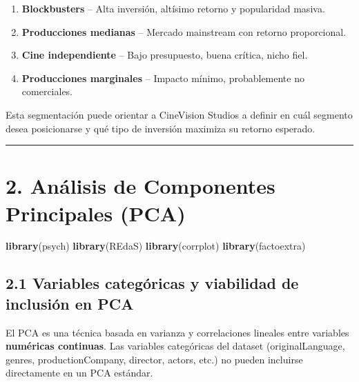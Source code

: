 \documentclass[
]{article}
\newenvironment{Shaded}{\begin{snugshade}}{\end{snugshade}}
\newcommand{\FunctionTok}[1]{\textcolor[rgb]{0.13,0.29,0.53}{\textbf{#1}}}
\newcommand{\NormalTok}[1]{#1}
\providecommand{\tightlist}{%
  \setlength{\itemsep}{0pt}\setlength{\parskip}{0pt}}
\begin{document}
\begin{enumerate}
\def\labelenumi{\arabic{enumi}.}
\tightlist
\item
  \textbf{Blockbusters} -- Alta inversión, altísimo retorno y
  popularidad masiva.\\
\item
  \textbf{Producciones medianas} -- Mercado mainstream con retorno
  proporcional.\\
\item
  \textbf{Cine independiente} -- Bajo presupuesto, buena crítica, nicho
  fiel.\\
\item
  \textbf{Producciones marginales} -- Impacto mínimo, probablemente no
  comerciales.
\end{enumerate}

Esta segmentación puede orientar a CineVision Studios a definir en cuál
segmento desea posicionarse y qué tipo de inversión maximiza su retorno
esperado.

\begin{center}\rule{0.5\linewidth}{0.5pt}\end{center}

\section{2. Análisis de Componentes Principales
(PCA)}\label{anuxe1lisis-de-componentes-principales-pca}

\begin{Shaded}
\begin{Highlighting}[]
\FunctionTok{library}\NormalTok{(psych)}
\FunctionTok{library}\NormalTok{(REdaS)}
\FunctionTok{library}\NormalTok{(corrplot)}
\FunctionTok{library}\NormalTok{(factoextra)}
\end{Highlighting}
\end{Shaded}

\subsection{2.1 Variables categóricas y viabilidad de inclusión en
PCA}\label{variables-categuxf3ricas-y-viabilidad-de-inclusiuxf3n-en-pca}

El PCA es una técnica basada en varianza y correlaciones lineales entre
variables \textbf{numéricas continuas}. Las variables categóricas del
dataset (originalLanguage, genres, productionCompany, director, actors,
etc.) no pueden incluirse directamente en un PCA estándar.
\end{document}
